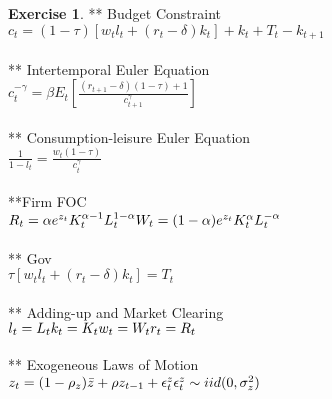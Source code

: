 \documentclass[letterpaper,12pt]{article}
\theoremstyle{definition}
\newtheorem{exercise}[theorem]{Exercise}
\begin{document}
\begin{spacing}{1.5}
	\begin{exercise} 
** Budget Constraint \\
$c_t = (1-\tau)[w_tl_t + (r_t-\delta)k_t] + k_t + T_t - k_{t+1}$\\
\\** Intertemporal Euler Equation\\
$c_t^{-\gamma} = \beta E_t[\frac{(r_{t+1}-\delta)(1-\tau) +1}{c_{t+1}^{\gamma}}]$
\\
\\** Consumption-leisure Euler Equation\\
$\frac{1}{1-l_t} = \frac{w_t(1-\tau)}{c_t^{\gamma}}$\\
\\**Firm FOC\\
$R_t = \alpha e^{z_t}K_t^{\alpha-1}L_t^{1-\alpha}\\
W_t = (1-\alpha) e^{z_t}K_t^{\alpha}L_t^{-\alpha}$
\\
\\** Gov\\
$\tau[w_tl_t + (r_t-\delta)k_t] = T_t$
\\
\\** Adding-up and Market Clearing\\
$l_t = L_t\\
k_t = K_t\\
w_t = W_t\\
r_t = R_t$
\\
\\** Exogeneous Laws of Motion\\
$z_t = (1-\rho_z)\bar{z} + \rho z_{t-1} +\epsilon_t^z\\
\epsilon_t^z \sim iid(0, \sigma_z^2) $
	\end{exercise}


\end{spacing}
\end{document}
